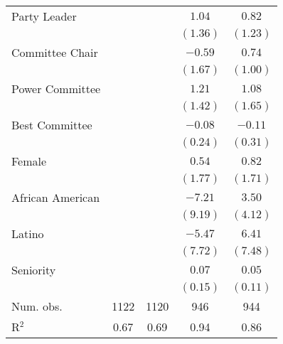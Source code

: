 \documentclass[12pt]{article}
\begin{document}
\begin{table}[!htbp]
\begin{threeparttable}
\begin{tabular}{l c c c c }
Party Leader                      &               &            & $1.04$        & $0.82$        \\
                                  &               &            & $(1.36)$      & $(1.23)$      \\
Committee Chair                   &               &            & $-0.59$       & $0.74$        \\
                                  &               &            & $(1.67)$      & $(1.00)$      \\
Power Committee                   &               &            & $1.21$        & $1.08$        \\
                                  &               &            & $(1.42)$      & $(1.65)$      \\
Best Committee                    &               &            & $-0.08$       & $-0.11$       \\
                                  &               &            & $(0.24)$      & $(0.31)$      \\
Female                            &               &            & $0.54$        & $0.82$        \\
                                  &               &            & $(1.77)$      & $(1.71)$      \\
African American                  &               &            & $-7.21$       & $3.50$        \\
                                  &               &            & $(9.19)$      & $(4.12)$      \\
Latino                            &               &            & $-5.47$       & $6.41$        \\
                                  &               &            & $(7.72)$      & $(7.48)$      \\
Seniority                         &               &            & $0.07$        & $0.05$        \\
                                  &               &            & $(0.15)$      & $(0.11)$      \\
\hline
Num. obs.                         & 1122          & 1120       & 946           & 944           \\
R$^2$%
                                  & 0.67          & 0.69       & 0.94          & 0.86          \\

\end{tabular}
\end{threeparttable}
\end{table}
\end{document}
